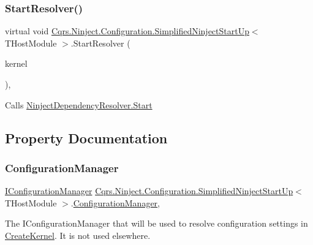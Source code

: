 \subsubsection{\texorpdfstring{Start\+Resolver()}{StartResolver()}}
{\footnotesize\ttfamily virtual void \hyperlink{classCqrs_1_1Ninject_1_1Configuration_1_1SimplifiedNinjectStartUp}{Cqrs.\+Ninject.\+Configuration.\+Simplified\+Ninject\+Start\+Up}$<$ T\+Host\+Module $>$.Start\+Resolver (\begin{DoxyParamCaption}\item[{I\+Kernel}]{kernel }\end{DoxyParamCaption})\hspace{0.3cm}{\ttfamily [protected]}, {\ttfamily [virtual]}}



Calls \hyperlink{classCqrs_1_1Ninject_1_1Configuration_1_1NinjectDependencyResolver_adc6171ed45679dcbaa67782770ba5083_adc6171ed45679dcbaa67782770ba5083}{Ninject\+Dependency\+Resolver.\+Start} 



\subsection{Property Documentation}
\mbox{\label{classCqrs_1_1Ninject_1_1Configuration_1_1SimplifiedNinjectStartUp_ae47357929d5c42f602a97e6b5dd6b0c4_ae47357929d5c42f602a97e6b5dd6b0c4}} 
\subsubsection{\texorpdfstring{Configuration\+Manager}{ConfigurationManager}}
{\footnotesize\ttfamily \hyperlink{interfaceCqrs_1_1Configuration_1_1IConfigurationManager}{I\+Configuration\+Manager} \hyperlink{classCqrs_1_1Ninject_1_1Configuration_1_1SimplifiedNinjectStartUp}{Cqrs.\+Ninject.\+Configuration.\+Simplified\+Ninject\+Start\+Up}$<$ T\+Host\+Module $>$.\hyperlink{classCqrs_1_1Configuration_1_1ConfigurationManager}{Configuration\+Manager}\hspace{0.3cm}{\ttfamily [get]}, {\ttfamily [protected]}}



The I\+Configuration\+Manager that will be used to resolve configuration settings in \hyperlink{classCqrs_1_1Ninject_1_1Configuration_1_1SimplifiedNinjectStartUp_aac5ea630535b31520d4c1536bc8125ce_aac5ea630535b31520d4c1536bc8125ce}{Create\+Kernel}. It is not used elsewhere. 

